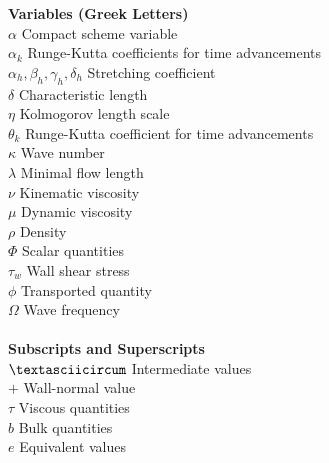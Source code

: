 \begin{tabbing}
	\textbf{Variables (Greek Letters)}\\
	$\alpha$ \> Compact scheme variable \\
	$\alpha_{k}$ \>  Runge-Kutta coefficients for time advancements \\
	$\alpha_h, \beta_h, \gamma_h, \delta_h$ \> Stretching coefficient\\
	$\delta$ \> Characteristic length \\
	$\eta$ \> Kolmogorov length scale\\
	$\theta_{k}$ \> Runge-Kutta coefficient for time advancements \\
	$\kappa$ \> Wave number \\
	$\lambda$ \> Minimal flow length \\
	$\nu$ \> Kinematic viscosity \\
	$\mu$ \> Dynamic viscosity\\
	$\rho$ \> Density\\
	$\Phi$ \> Scalar quantities \\
	$\tau_w$ \> Wall shear stress\\
	$\phi$ \> Transported quantity\\
	$\Omega$ \> Wave frequency \\
	
	\\
	\textbf{Subscripts and Superscripts}\\
	$\textasciicircum$ \> Intermediate values\\
	$+$ \> Wall-normal value\\
	$\tau$ \> Viscous quantities\\
	$b$ \> Bulk quantities\\
	$e$ \> Equivalent values\\
\end{tabbing}







